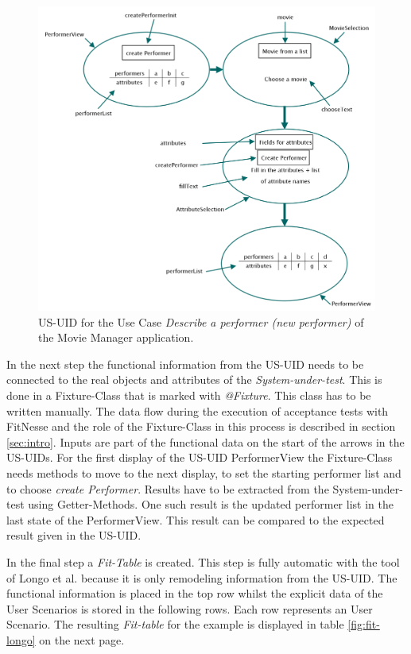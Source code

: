 \begin{figure}[H]
	\centering
	\includegraphics[width=.85\textwidth]{../images/US-UID.png}
	\caption{US-UID for the Use Case \textit{Describe a performer (new performer)} of the Movie Manager application.}
	\label{fig:us-uid-mm}
\end{figure}

In the next step the functional information from the US-UID needs to be connected to the real
objects and attributes of the \textit{System-under-test}. This is done in a Fixture-Class that is marked
with \textit{@Fixture}.
This class has to be written manually.
The data flow during the execution of acceptance tests with FitNesse and the role of the Fixture-Class in this process is described in section \ref{sec:intro}.
Inputs are part of the functional data on the start of the arrows in the US-UIDs. 
For the first display of the US-UID PerformerView the Fixture-Class needs methods to move to the next display, to set the starting performer list and to choose
\textit{create Performer}.
Results have to be extracted from the System-under-test using Getter-Methods.
One such result is the updated performer list in the last state of the PerformerView.
This result can be compared to the expected result given in the US-UID.

In the final step a \textit{Fit-Table} is created.
This step is fully automatic with the tool of Longo et al. because it is only remodeling information from the US-UID.
The functional information is placed in the top row whilst the explicit data of the User Scenarios is stored in the following rows.
Each row represents an User Scenario.
The resulting \textit{Fit-table} for the example is displayed in table \ref{fig:fit-longo} on the next page.

